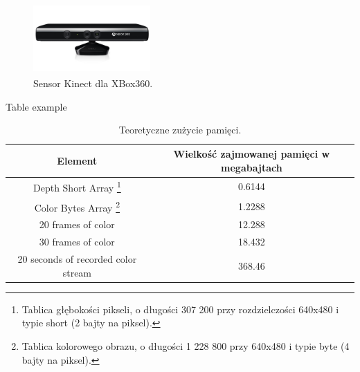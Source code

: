 \begin{figure}[h]
    \centering
    \includegraphics[width=1.7614in,height=1.0579in]{graphics/kinect.png}
    \caption{Sensor Kinect dla XBox360.}
    \label{sensorFrontPic}
\end{figure}

\bigskip

Table example

\begin{table}[h!]
    \centering
    \begin{tabular}{||c c||}
        \hline
        Element & Wielkość zajmowanej pamięci w megabajtach \\ [0.5ex]
        \hline\hline
        Depth Short Array
        \footnote{Tablica głębokości pikseli, o długości 307 200 przy
        rozdzielczości 640x480 i typie short (2 bajty na piksel).}
        & 0.6144 \\
        Color Bytes Array
        \footnote{Tablica kolorowego obrazu, o długości 1 228 800
        przy 640x480 i typie byte (4 bajty na piksel).}
        & 1.2288 \\
        20 frames of color
        & 12.288 \\
        30 frames of color
        & 18.432 \\
        20 seconds of recorded color stream
        & 368.46 \\
        \hline
    \end{tabular}
    \caption{Teoretyczne zużycie pamięci.}
    \label{memoryConsumption}
\end{table}
